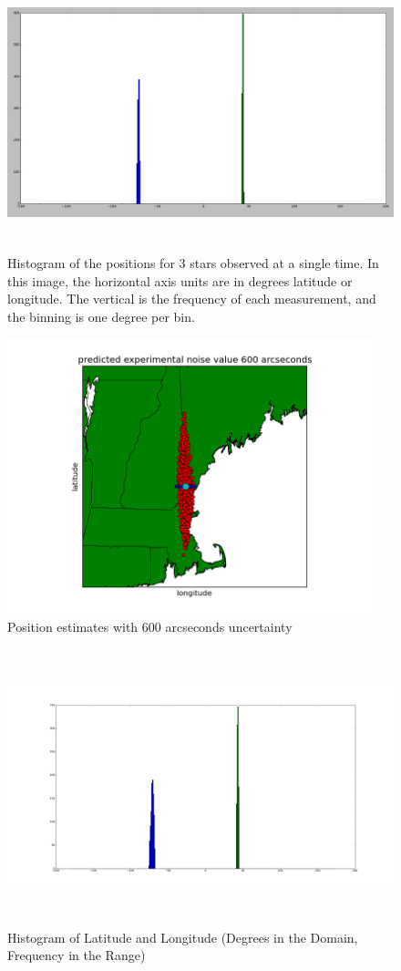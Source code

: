 \documentclass[]{aiaa-tc}%
\begin{document}
\begin{figure}[b!]
\centering
\includegraphics[height=8cm]{3s1t_hist.png}
\caption{Histogram of the positions for 3 stars observed at a single time.  In this image, the horizontal axis units are in degrees latitude or longitude.  The vertical is the frequency of each measurement, and the binning is one degree per bin.}
\label{f:3s1t_hist}
\end{figure}%
\begin{figure}[b!]
\centering
\includegraphics[height=8cm]{map2222.png}
\caption{Position estimates with 600 arcseconds uncertainty}
\label{f:crush}
\end{figure}
\begin{figure}[b!]
\centering
\includegraphics[height=8cm]{histogram2222.png}
\caption{Histogram of Latitude and Longitude (Degrees in the Domain, Frequency in the Range)}
\label{fig:hw2_prob1}
\end{figure}
\end{document}
